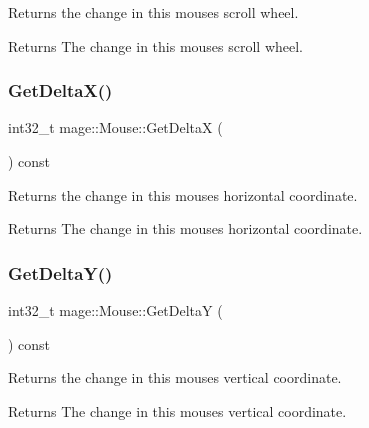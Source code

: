 Returns the change in this mouse\textquotesingle{}s scroll wheel.

\begin{DoxyReturn}{Returns}
The change in this mouse\textquotesingle{}s scroll wheel. 
\end{DoxyReturn}
\hypertarget{classmage_1_1_mouse_a4268857c537895bd1aea144120254fa4}{}\label{classmage_1_1_mouse_a4268857c537895bd1aea144120254fa4} 
\subsubsection{\texorpdfstring{Get\+Delta\+X()}{GetDeltaX()}}
{\footnotesize\ttfamily int32\+\_\+t mage\+::\+Mouse\+::\+Get\+DeltaX (\begin{DoxyParamCaption}{ }\end{DoxyParamCaption}) const}

Returns the change in this mouse\textquotesingle{}s horizontal coordinate.

\begin{DoxyReturn}{Returns}
The change in this mouse\textquotesingle{}s horizontal coordinate. 
\end{DoxyReturn}
\hypertarget{classmage_1_1_mouse_a43acf31458088ae2d779fecdac2be0c6}{}\label{classmage_1_1_mouse_a43acf31458088ae2d779fecdac2be0c6} 
\subsubsection{\texorpdfstring{Get\+Delta\+Y()}{GetDeltaY()}}
{\footnotesize\ttfamily int32\+\_\+t mage\+::\+Mouse\+::\+Get\+DeltaY (\begin{DoxyParamCaption}{ }\end{DoxyParamCaption}) const}

Returns the change in this mouse\textquotesingle{}s vertical coordinate.

\begin{DoxyReturn}{Returns}
The change in this mouse\textquotesingle{}s vertical coordinate. 
\end{DoxyReturn}
\hypertarget{classmage_1_1_mouse_a9c8d4493c86685b259819b5995a17c7a}{}\label{classmage_1_1_mouse_a9c8d4493c86685b259819b5995a17c7a} 
